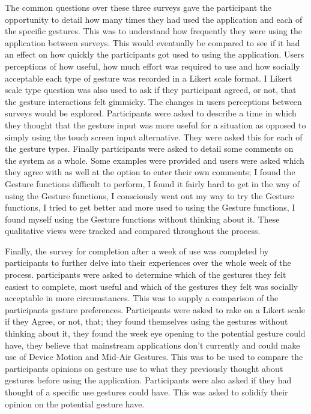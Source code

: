 \documentclass{l4proj}
\begin{document}
The common questions over these three surveys gave the participant the opportunity to detail how many times they had used the application and each of the specific gestures. This was to understand how frequently they were using the application between surveys. This would eventually be compared to see if it had an effect on how quickly the participants got used to using the application. Users perceptions of how useful, how much effort was required to use and how socially acceptable each type of gesture was recorded in a Likert scale format. I Likert scale type question was also used to ask if they participant agreed, or not, that the gesture interactions felt gimmicky. The changes in users perceptions between surveys would be explored. Participants were asked to describe a time in which they thought that the gesture input was more useful for a situation as opposed to simply using the touch screen input alternative. They were asked this for each of the gesture types. Finally participants were asked to detail some comments on the system as a whole. Some examples were provided and users were asked which they agree with as well at the option to enter their own comments; I found the Gesture functions difficult to perform, I found it fairly hard to get in the way of using the Gesture functions, I consciously went out my way to try the Gesture functions, I tried to get better and more used to using the Gesture functions, I found myself using the Gesture functions without thinking about it. These qualitative views were tracked and compared throughout the process.

Finally, the survey for completion after a week of use was completed by participants to further delve into their experiences over the whole week of the process. participants were asked to determine which of the gestures they felt easiest to complete, most useful and which of the gestures they felt was socially acceptable in more circumstances. This was to supply a comparison of the participants gesture preferences. Participants were asked to rake on a Likert scale if they Agree, or not, that; they found themselves using the gestures without thinking about it, they  found the week eye opening to the potential gesture could have, they believe that mainstream applications don't currently and could make use of Device Motion and Mid-Air Gestures. This was to be used to compare the participants opinions on gesture use to what they previously thought about gestures before using the application. Participants were also asked if they had thought of a specific use gestures could have. This was asked to solidify their opinion on the potential gesture have.
\end{document}
